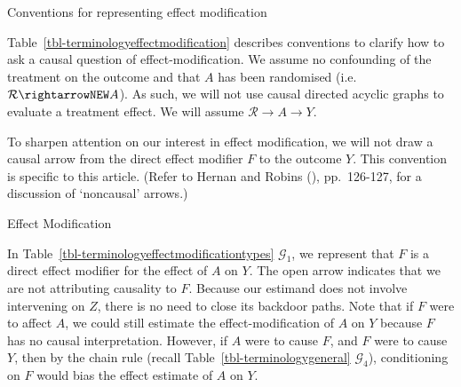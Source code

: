 \documentclass[
  single column]{article}
\begin{document}
\begin{table}

\caption{\label{tbl-terminologyeffectmodification}Conventions for
representing effect modification}

\centering{

\terminologyeffectmodification

}

\end{table}%

Table~\ref{tbl-terminologyeffectmodification} describes conventions to
clarify how to ask a causal question of effect-modification. We assume
no confounding of the treatment on the outcome and that \(A\) has been
randomised (i.e.~\(\mathcal{R} \rightarrowNEW A\)). As such, we will not
use causal directed acyclic graphs to evaluate a treatment effect. We
will assume \(\mathcal{R}  \to A \to Y\).

To sharpen attention on our interest in effect modification, we will not
draw a causal arrow from the direct effect modifier \(F\) to the outcome
\(Y\). This convention is specific to this article. (Refer to Hernan and
Robins (), pp.~126-127, for a
discussion of `noncausal' arrows.)

\begin{table}

\caption{\label{tbl-terminologyeffectmodificationtypes}Effect
Modification}

\centering{

\terminologyeffectmodificationtypes

}

\end{table}%

In Table~\ref{tbl-terminologyeffectmodificationtypes} \(\mathcal{G}_1\),
we represent that \(F\) is a direct effect modifier for the effect of
\(A\) on \(Y\). The open arrow indicates that we are not attributing
causality to \(F\). Because our estimand does not involve intervening on
\(Z\), there is no need to close its backdoor paths. Note that if \(F\)
were to affect \(A\), we could still estimate the effect-modification of
\(A\) on \(Y\) because \(F\) has no causal interpretation. However, if
\(A\) were to cause \(F\), and \(F\) were to cause \(Y\), then by the
chain rule (recall Table~\ref{tbl-terminologygeneral}
\(\mathcal{G}_4\)), conditioning on \(F\) would bias the effect estimate
of \(A\) on \(Y\).
\end{document}
